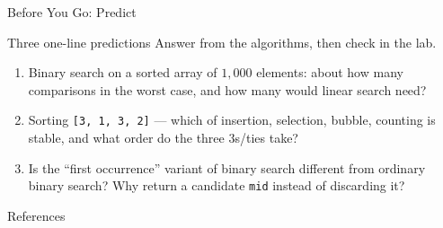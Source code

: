 \documentclass[aspectratio=169]{beamer}
\begin{document}
\begin{frame}{Before You Go: Predict}
  \begin{block}{Three one-line predictions}
    Answer from the algorithms, then check in the lab.
  \end{block}
  \begin{enumerate}
    \item Binary search on a sorted array of $1{,}000$ elements: about how
      many comparisons in the worst case, and how many would linear search
      need?
    \item Sorting \texttt{[3, 1, 3, 2]} --- which of insertion, selection,
      bubble, counting is stable, and what order do the three $3$s/ties take?
    \item Is the ``first occurrence'' variant of binary search different
      from ordinary binary search? Why return a candidate \texttt{mid}
      instead of discarding it?
  \end{enumerate}
\end{frame}

\begin{frame}[allowframebreaks]{References}
  \scriptsize
  
  
\end{frame}
\end{document}
